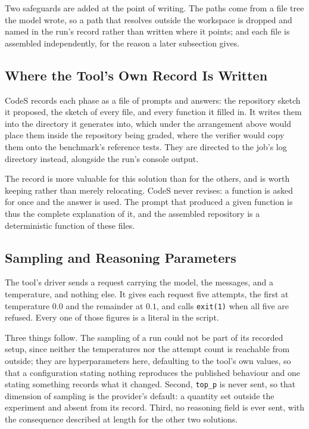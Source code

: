 Two safeguards are added at the point of writing. The paths come from a file
tree the model wrote, so a path that resolves outside the workspace is dropped
and named in the run's record rather than written where it points; and each
file is assembled independently, for the reason a later subsection gives.

\subsection{Where the Tool's Own Record Is Written}

CodeS records each phase as a file of prompts and answers: the repository
sketch it proposed, the sketch of every file, and every function it filled in.
It writes them into the directory it generates into, which under the
arrangement above would place them inside the repository being graded, where
the verifier would copy them onto the benchmark's reference tests. They are
directed to the job's log directory instead, alongside the run's console
output.

The record is more valuable for this solution than for the others, and is worth
keeping rather than merely relocating. CodeS never revises: a function is asked
for once and the answer is used. The prompt that produced a given function is
thus the complete explanation of it, and the assembled repository is a
deterministic function of these files.

\subsection{Sampling and Reasoning Parameters}

The tool's driver sends a request carrying the model, the messages, and a
temperature, and nothing else. It gives each request five attempts, the first
at temperature $0.0$ and the remainder at $0.1$, and calls \texttt{exit(1)}
when all five are refused. Every one of those figures is a literal in the
script.

Three things follow. The sampling of a run could not be part of its recorded
setup, since neither the temperatures nor the attempt count is reachable from
outside; they are hyperparameters here, defaulting to the tool's own values, so
that a configuration stating nothing reproduces the published behaviour and one
stating something records what it changed. Second, \texttt{top\_p} is never
sent, so that dimension of sampling is the provider's default: a quantity set
outside the experiment and absent from its record. Third, no reasoning field is
ever sent, with the consequence described at length for the other two
solutions.

